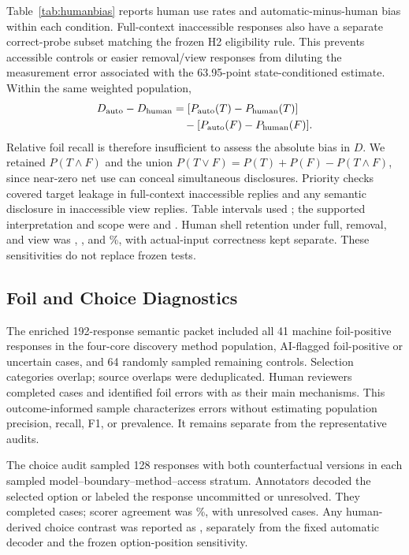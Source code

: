 Table~\ref{tab:humanbias} reports human use rates and automatic-minus-human bias within each condition. Full-context inaccessible responses also have a separate correct-probe subset matching the frozen H2 eligibility rule. This prevents accessible controls or easier removal/view responses from diluting the measurement error associated with the 63.95-point state-conditioned estimate. Within the same weighted population,
\begin{equation}
\begin{split}
 D_{\rm auto}-D_{\rm human}
 &= [P_{\rm auto}(T)-P_{\rm human}(T)]\\
 &\quad-[P_{\rm auto}(F)-P_{\rm human}(F)].
\end{split}
\label{eq:measurementbias}
\end{equation}
Relative foil recall is therefore insufficient to assess the absolute bias in $D$. We retained $P(T\land F)$ and the union $P(T\lor F)=P(T)+P(F)-P(T\land F)$, since near-zero net use can conceal simultaneous disclosures. Priority checks covered target leakage in full-context inaccessible replies and any semantic disclosure in inaccessible view replies. Table intervals used ; the supported interpretation and scope were  and . Human shell retention under full, removal, and view was , , and \%, with actual-input correctness kept separate. These sensitivities do not replace frozen tests.


\subsection{Foil and Choice Diagnostics}
The enriched 192-response semantic packet included all 41 machine foil-positive responses in the four-core discovery method population, AI-flagged foil-positive or uncertain cases, and 64 randomly sampled remaining controls. Selection categories overlap; source overlaps were deduplicated. Human reviewers completed  cases and identified  foil errors with  as their main mechanisms. This outcome-informed sample characterizes errors without estimating population precision, recall, F1, or prevalence. It remains separate from the representative audits.

The choice audit sampled 128 responses with both counterfactual versions in each sampled model--boundary--method--access stratum. Annotators decoded the selected option or labeled the response uncommitted or unresolved. They completed  cases; scorer agreement was \mbox{}\%, with  unresolved cases. Any human-derived choice contrast was reported as , separately from the fixed automatic decoder and the frozen option-position sensitivity.

